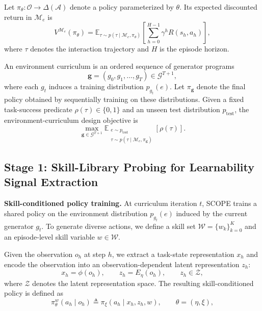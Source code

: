 \documentclass[conference]{IEEEtran}
\begin{document}
Let $\pi_\theta:\mathcal{O}\rightarrow\Delta(\mathcal{A})$ denote a policy
parameterized by $\theta$. Its expected discounted return in $\mathcal{M}_e$ is
\begin{equation}
 V^{\mathcal{M}_e}(\pi_\theta)=
 \mathbb{E}_{\tau\sim p(\tau\mid\mathcal{M}_e,\pi_\theta)}
 \left[\sum_{h=0}^{H-1}\gamma^h R(s_h,a_h)\right],
 \label{eq:environment-value}
\end{equation}
where $\tau$ denotes the interaction trajectory and $H$ is the episode horizon.

An environment curriculum is an ordered sequence of generator programs
\begin{equation}
 \mathbf{g}=(g_0,g_1,\ldots,g_T)\in\mathcal{G}^{T+1},
 \label{eq:generator-curriculum}
\end{equation}
where each $g_t$ induces a training distribution $p_{g_t}(e)$. Let
$\pi_{\mathbf{g}}$ denote the final policy obtained by sequentially training on
these distributions. Given a fixed task-success predicate
$\rho(\tau)\in\{0,1\}$ and an unseen test distribution $p_{\mathrm{test}}$, the
environment-curriculum design objective is
\begin{equation}
 \max_{\mathbf{g}\in\mathcal{G}^{T+1}}
 \mathbb{E}_{\substack{e\sim p_{\mathrm{test}}\\
 \tau\sim p(\tau\mid\mathcal{M}_e,\pi_{\mathbf{g}})}}
 \left[\rho(\tau)\right].
 \label{eq:curriculum-objective}
\end{equation}

\subsection{Stage 1: Skill-Library Probing for Learnability Signal Extraction}
\label{sec:signal}

\textbf{Skill-conditioned policy training.}
At curriculum iteration $t$, SCOPE trains a shared policy on the environment
distribution $p_{g_t}(e)$ induced by the current generator $g_t$. To generate
diverse actions, we define a skill set $\mathcal W=\{w_k\}_{k=0}^{K}$ and an
episode-level skill variable $w\in\mathcal W$.

Given the observation $o_h$ at step $h$, we extract a task-state representation
$x_h$ and encode the observation into an observation-dependent latent
representation $z_h$:
\begin{equation}
 x_h=\phi(o_h),
 \qquad
 z_h=E_\eta(o_h),
 \qquad
 z_h\in\mathcal Z,
 \label{eq:observation-latent}
\end{equation}
where $\mathcal Z$ denotes the latent representation space. The resulting
skill-conditioned policy is defined as
\begin{equation}
 \pi_\theta^w(a_h\mid o_h)
 \triangleq
 \pi_\xi(a_h\mid x_h,z_h,w),
 \qquad
 \theta=(\eta,\xi),
 \label{eq:skill-policy}
\end{equation}
\end{document}
